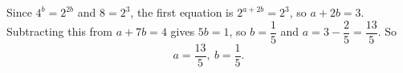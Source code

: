 Since $4^b=2^{2b}$ and $8=2^3$, the first equation is $2^{a+2b}=2^3$, so $a+2b=3$. Subtracting this from $a+7b=4$ gives $5b=1$, so $b=\dfrac15$ and $a=3-\dfrac25=\dfrac{13}5$. So
\[\boxed{a=\dfrac{13}{5},\ b=\dfrac15}.\]

